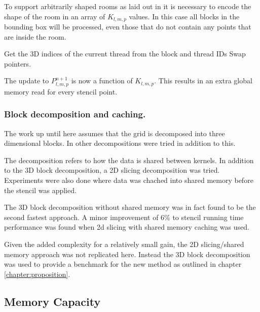 \documentclass[12pt,a4paper]{report}
\begin{document}
To support arbitrarily shaped rooms as laid out in \cite{brian} it is necessary to encode the shape of the room in an array of $K_{l,m,p}$ values. In this case all blocks in the bounding box will be processed, even those that do not contain any points that are inside the room.

\IncMargin{1em}
\begin{algorithm}[H]
 Get the 3D indices of the current thread from the block and thread IDs\;
 Swap pointers.
 \caption{CUDA kernel for update on an irregularly shaped room.}
\end{algorithm}

The update to $P_{l,m,p}^{n+1}$ is now a function of $K_{l,m,p}$. This results in an extra global memory read for every stencil point.

\subsubsection{Block decomposition and caching.}
\label{section:decomps}
The work up until here assumes that the grid is decomposed into three dimensional blocks. In \cite{craig} other decompositions were tried in addition to this.

The decomposition refers to how the data is shared between kernels. In addition to the 3D block decomposition, a 2D slicing decomposition was tried. Experiments were also done where data was chached into shared memory before the stencil was applied.

The 3D block decomposition without shared memory was in fact found to be the second fastest approach. A minor improvement of \num{6}\% to stencil running time performance was found when 2d slicing with shared memory caching was used.

Given the added complexity for a relatively small gain, the 2D slicing/shared memory approach was not replicated here. Instead the 3D block decomposition was used to provide a benchmark for the new method as outlined in chapter \ref{chapter:proposition}.

\subsection{Memory Capacity}
\end{document}
